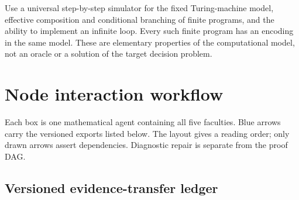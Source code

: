 \documentclass[preprint,12pt,aps,pra,showkeys,amsmath,amssymb,superscriptaddress,floatfix]{revtex4-2}
\theoremstyle{definition}
\theoremstyle{remark}
\begin{document}
Use a universal step-by-step simulator for the fixed Turing-machine
model, effective composition and conditional branching of finite
programs, and the ability to implement an infinite loop. Every such
finite program has an encoding in the same model. These are elementary
properties of the computational model, not an oracle or a solution of
the target decision problem.

\clearpage\section{Node interaction workflow}

\begin{center}\end{center}

Each box is one mathematical agent containing all five faculties. Blue
arrows carry the versioned exports listed below. The layout gives a
reading order; only drawn arrows assert dependencies. Diagnostic repair
is separate from the proof DAG.

\subsection{Versioned evidence-transfer ledger}
\end{document}

